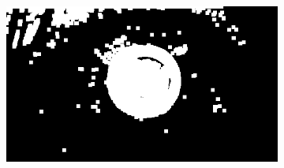 \documentclass{article}
\begin{document}
\begin{figure}[H]
\begin{subfigure}{.47\textwidth}
  \centering
  \includegraphics[width=0.97\linewidth]{_Figures/raw_data_1_dilation.png}
  \caption{}
  \label{fig:raw_1_dilation}
\end{subfigure}


\end{figure}
\end{document}
